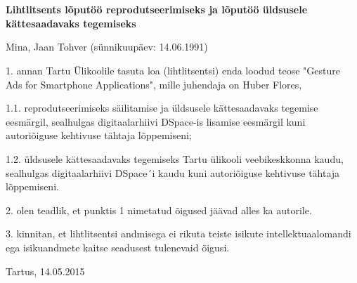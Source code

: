 \thispagestyle{empty} 

\chapter*{}

\textbf{Lihtlitsents l\~{o}put\"{o}\"{o} reprodutseerimiseks ja l\~{o}put\"{o}\"{o} \"{u}ldsusele k\"{a}ttesaadavaks tegemiseks}

\bigskip

Mina, Jaan Tohver (s\"{u}nnikuup\"{a}ev: 14.06.1991)

\bigskip

1. annan Tartu \"{U}likoolile tasuta loa (lihtlitsentsi) enda loodud teose "Gesture Ads for Smartphone Applications", mille juhendaja on Huber Flores,

\bigskip

1.1. reprodutseerimiseks s\"{a}ilitamise ja \"{u}ldsusele k\"{a}ttesaadavaks tegemise eesm\"{a}rgil, sealhulgas digitaalarhiivi DSpace-is lisamise eesm\"{a}rgil kuni autori\~{o}iguse kehtivuse t\"{a}htaja l\~{o}ppemiseni;

\medskip

1.2. \"{u}ldsusele k\"{a}ttesaadavaks tegemiseks Tartu \"{u}likooli veebikeskkonna kaudu, sealhulgas digitaalarhiivi DSpace´i kaudu kuni autori\~{o}iguse kehtivuse t\"{a}htaja l\~{o}ppemiseni.

\bigskip

2. olen teadlik, et punktis 1 nimetatud \~{o}igused j\"{a}\"{a}vad alles ka autorile.

\bigskip

3. kinnitan, et lihtlitsentsi andmisega ei rikuta teiste isikute intellektuaalomandi ega isikuandmete kaitse seadusest tulenevaid \~{o}igusi.

\bigskip

Tartus, 14.05.2015
